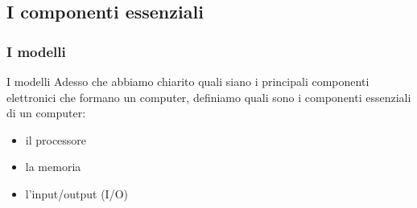 	



\subsection[I componenti essenziali]{I componenti essenziali}
\begin{frame}
	\frametitle{I modelli}
	
	\begin{block}{I modelli}
		Adesso che abbiamo chiarito quali siano i principali componenti elettronici che formano un computer, definiamo quali sono i componenti essenziali di un computer:
		\begin{itemize}
			\item il processore
			\item la memoria
			\item l'input/output (I/O)
		\end{itemize}
		
	\end{block}
	
\end{frame}



%	
%	
%	



